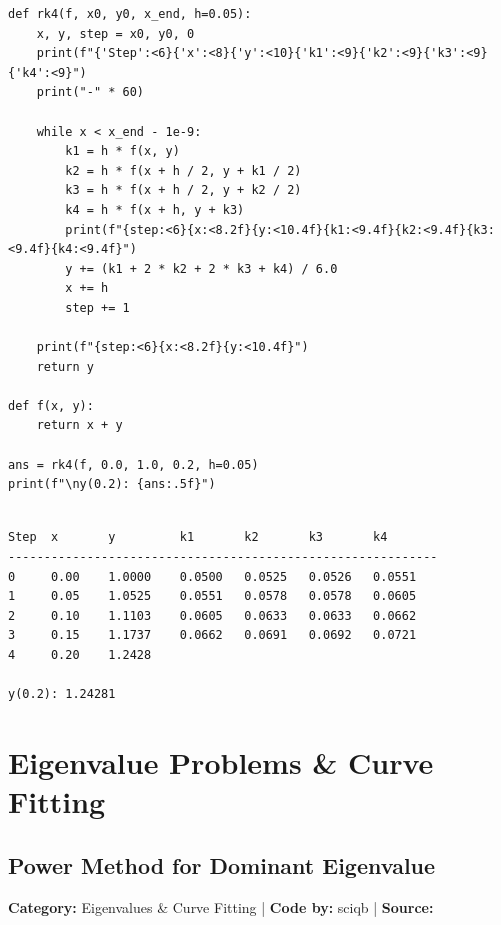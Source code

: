 \documentclass[10pt,a4paper]{report}
\begin{document}
\begin{tcolorbox}[colback=codebg,colframe=secondary,title=\textbf{Python Implementation (Step-by-Step Functions)},boxrule=1pt,arc=2mm]
\begin{lstlisting}[style=python_detailed]
def rk4(f, x0, y0, x_end, h=0.05):
    x, y, step = x0, y0, 0
    print(f"{'Step':<6}{'x':<8}{'y':<10}{'k1':<9}{'k2':<9}{'k3':<9}{'k4':<9}")
    print("-" * 60)

    while x < x_end - 1e-9:
        k1 = h * f(x, y)
        k2 = h * f(x + h / 2, y + k1 / 2)
        k3 = h * f(x + h / 2, y + k2 / 2)
        k4 = h * f(x + h, y + k3)
        print(f"{step:<6}{x:<8.2f}{y:<10.4f}{k1:<9.4f}{k2:<9.4f}{k3:<9.4f}{k4:<9.4f}")
        y += (k1 + 2 * k2 + 2 * k3 + k4) / 6.0
        x += h
        step += 1

    print(f"{step:<6}{x:<8.2f}{y:<10.4f}")
    return y

def f(x, y):
    return x + y

ans = rk4(f, 0.0, 1.0, 0.2, h=0.05)
print(f"\ny(0.2): {ans:.5f}")


\end{lstlisting}
\end{tcolorbox}

\begin{tcolorbox}[colback=termbg,colframe=primary,title=\textbf{Program Execution Output \& Convergence Table},boxrule=1pt,arc=2mm]
\begin{lstlisting}[style=terminal_output]
Step  x       y         k1       k2       k3       k4       
------------------------------------------------------------
0     0.00    1.0000    0.0500   0.0525   0.0526   0.0551   
1     0.05    1.0525    0.0551   0.0578   0.0578   0.0605   
2     0.10    1.1103    0.0605   0.0633   0.0633   0.0662   
3     0.15    1.1737    0.0662   0.0691   0.0692   0.0721   
4     0.20    1.2428    

y(0.2): 1.24281
\end{lstlisting}
\end{tcolorbox}

\newpage

\chapter{Eigenvalue Problems \& Curve Fitting}


\section{Power Method for Dominant Eigenvalue}
\textbf{Category:} \textcolor{secondary}{Eigenvalues \& Curve Fitting} \quad | \quad \textbf{Code by:} \textcolor{secondary}{sciqb} \quad | \quad \textbf{Source:} \texttt{}
\end{document}
